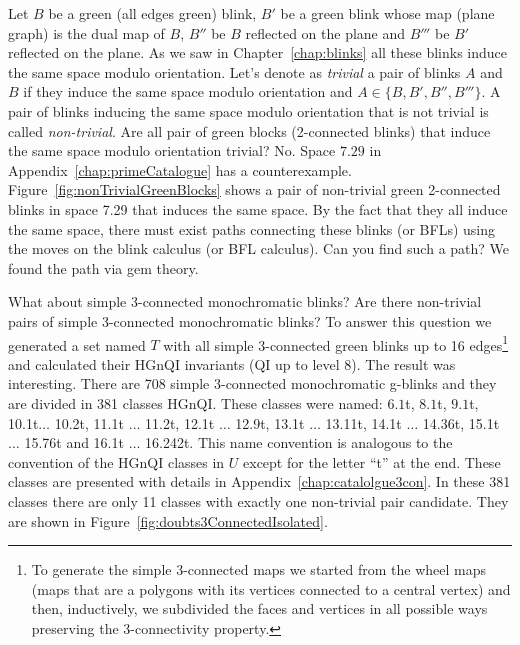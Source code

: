 Let $B$ be a green (all edges green) blink, $B'$ be a green blink
whose map (plane graph) is the dual map of $B$, $B''$ be $B$
reflected on the plane and $B'''$ be $B'$ reflected on the plane.
As we saw in Chapter~\ref{chap:blinks} all these blinks induce the
same space modulo orientation. Let's denote as {\it trivial}
a pair of blinks $A$ and $B$ if they induce the same space modulo
orientation and $A \in \{B,B',B'',B'''\}$. A pair of blinks inducing
the same space modulo orientation that is not trivial is called
{\it non-trivial}. Are all pair of green blocks (2-connected blinks)
that induce the same space modulo orientation trivial?
No. Space $7.29$ in Appendix~\ref{chap:primeCatalogue}
has a counterexample. Figure~\ref{fig:nonTrivialGreenBlocks} shows
a pair of non-trivial green 2-connected blinks in space 7.29 that induces
the same space. By the fact that they  all induce the same space, there must exist
paths connecting these blinks (or BFLs) using the moves
on the blink calculus (or BFL
calculus). Can you find such a path? We found the path via gem theory.

What about simple 3-connected monochromatic blinks?  Are there
non-trivial pairs of simple 3-connected monochromatic blinks?
To answer this question we generated a set named $T$ with all simple
3-connected green blinks up to 16 edges\footnote{To generate the simple
3-connected maps we started from the wheel maps (maps that are a polygons
with its vertices connected to a central vertex) and then, inductively, we
subdivided the faces and vertices in all possible ways preserving the
3-connectivity property.}
and calculated their HGnQI invariants (QI up to level 8).
The result was interesting. There are
708 simple 3-connected monochromatic g-blinks and they are divided in 381
classes HGnQI. These classes were named: $6.1$t, $8.1$t, $9.1$t,
10.1t$\ldots$ 10.2t, 11.1t $\ldots$ 11.2t, 12.1t $\ldots$ 12.9t,
13.1t $\ldots$ 13.11t, 14.1t $\ldots$ 14.36t, 15.1t $\ldots$ 15.76t
and 16.1t $\ldots$ 16.242t. This name convention is analogous to
the convention of the HGnQI classes in $U$ except for the
letter ``t'' at the end. These classes are presented with details in
Appendix~\ref{chap:catalolgue3con}. In these 381 classes there are
only 11 classes with exactly one non-trivial pair candidate. They
are shown in Figure~\ref{fig:doubts3ConnectedIsolated}.

\enlargethispage{2cm}

